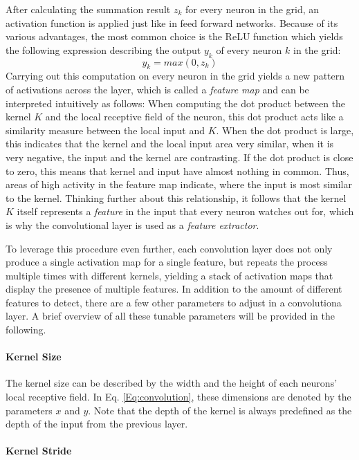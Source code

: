 After calculating the summation result \(z_k\) for every neuron in the
grid, an activation function is applied just like in feed forward
networks. Because of its various advantages, the most common choice is
the ReLU function which yields the following expression describing the
output \(y_k\) of every neuron \(k\) in the grid:
\begin{equation}
  y_k = max(0, z_k)
\end{equation}
Carrying out this computation on every neuron in the
grid yields a new pattern of activations across the layer, which is
called a \textit{feature map} and can be interpreted intuitively as
follows: When computing the dot product between the kernel \(K\) and
the local receptive field of the neuron, this dot product acts like a
similarity measure between the local input and \(K\). When the dot
product is large, this indicates that the kernel and the local input
area very similar, when it is very negative, the input and the kernel
are contrasting. If the dot product is close to zero, this means that
kernel and input have almost nothing in common. Thus, areas of high
activity in the feature map indicate, where the input is most similar
to the kernel. Thinking further about this relationship, it follows
that the kernel \(K\) itself represents a \textit{feature} in the
input that every neuron watches out for, which is why the
convolutional layer is used as a \textit{feature extractor}.

To leverage this procedure even further, each convolution layer does
not only produce a single activation map for a single feature, but
repeats the process multiple times with different kernels, yielding a
stack of activation maps that display the presence of multiple
features. In addition to the amount of different features to detect,
there are a few other parameters to adjust in a convolutiona layer.
A brief overview of all these tunable parameters will be provided in
the following.

\paragraph{Kernel Size}

The kernel size can be described by the width and the height of each
neurons' local receptive field. In Eq. \ref{Eq:convolution}, these
dimensions are denoted by the parameters \(x\) and \(y\). Note that
the depth of the kernel is always predefined as the depth of the input
from the previous layer.

\paragraph{Kernel Stride}

